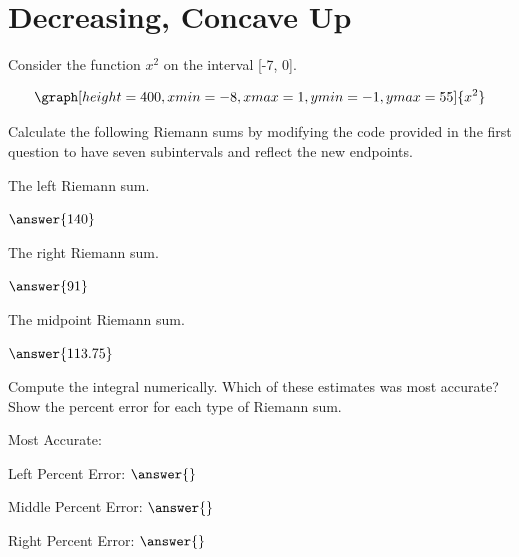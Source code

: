 \documentclass{ximera}
\begin{document}
\section{Decreasing, Concave Up}
\begin{question}
Consider the function $x^2$ on the interval [-7, 0].

\[
\graph[height=400,xmin=-8,xmax=1,ymin=-1,ymax=55]{x^2}
\]

Calculate the following Riemann sums by modifying the code provided in the first question to have seven subintervals and reflect the new endpoints.

The left Riemann sum.

\begin{onlineOnly}
\begin{sageCell}

\end{sageCell}
\end{onlineOnly}

$\answer{140}$

The right Riemann sum.

\begin{onlineOnly}
\begin{sageCell}

\end{sageCell}
\end{onlineOnly}

$\answer{91}$

The midpoint Riemann sum.

\begin{onlineOnly}
\begin{sageCell}

\end{sageCell}
\end{onlineOnly}

$\answer{113.75}$

Compute the integral numerically. Which of these estimates was most accurate? Show the percent error for each type of Riemann sum.

\begin{onlineOnly}
\begin{sageCell}

\end{sageCell}
\end{onlineOnly}

Most Accurate:
\begin{multipleChoice}
\end{multipleChoice}
Left Percent Error: $\answer{}$

Middle Percent Error: $\answer{}$

Right Percent Error: $\answer{}$
\end{question}
\end{document}
